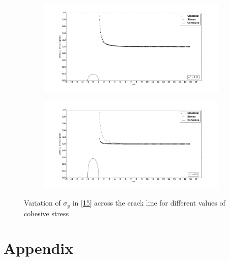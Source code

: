 \documentclass[authoryear,12pt]{elsarticle}
\begin{document}
		\begin{figure}[!]
			\begin{subfigure}{1\textwidth}
				\begin{center}
					\includegraphics[width=1.15\linewidth]{Stress_1.png}
				\end{center}
				\caption{}
			\end{subfigure}
			\begin{subfigure}{1\textwidth}
				\begin{center}
					\includegraphics[width=1.15\linewidth]{Stress_2.png}
				\end{center}
				\caption{}
			\end{subfigure}
			\caption{Variation of \(\sigma_y\) in \cref{15} across the crack line for different values of cohesive stress}
		\end{figure}	
		\newpage
		\section{Appendix}
		
		\newpage

\end{document}
